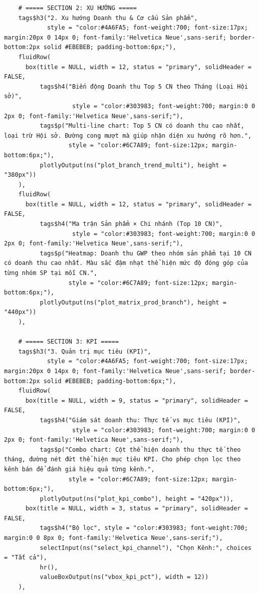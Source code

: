 \documentclass[12pt, a4paper]{article}
\begin{document}
\begin{lstlisting}
    # ===== SECTION 2: XU HƯỚNG =====
    tags$h3("2. Xu hướng Doanh thu & Cơ cấu Sản phẩm",
            style = "color:#4A6FA5; font-weight:700; font-size:17px; margin:20px 0 14px 0; font-family:'Helvetica Neue',sans-serif; border-bottom:2px solid #EBEBEB; padding-bottom:6px;"),
    fluidRow(
      box(title = NULL, width = 12, status = "primary", solidHeader = FALSE,
          tags$h4("Biến động Doanh thu Top 5 CN theo Tháng (Loại Hội sở)",
                   style = "color:#303983; font-weight:700; margin:0 0 2px 0; font-family:'Helvetica Neue',sans-serif;"),
          tags$p("Multi-line chart: Top 5 CN có doanh thu cao nhất, loại trừ Hội sở. Đường cong mượt mà giúp nhận diện xu hướng rõ hơn.",
                  style = "color:#6C7A89; font-size:12px; margin-bottom:6px;"),
          plotlyOutput(ns("plot_branch_trend_multi"), height = "380px"))
    ),
    fluidRow(
      box(title = NULL, width = 12, status = "primary", solidHeader = FALSE,
          tags$h4("Ma trận Sản phẩm × Chi nhánh (Top 10 CN)",
                   style = "color:#303983; font-weight:700; margin:0 0 2px 0; font-family:'Helvetica Neue',sans-serif;"),
          tags$p("Heatmap: Doanh thu GWP theo nhóm sản phẩm tại 10 CN có doanh thu cao nhất. Màu sắc đậm nhạt thể hiện mức độ đóng góp của từng nhóm SP tại mỗi CN.",
                  style = "color:#6C7A89; font-size:12px; margin-bottom:6px;"),
          plotlyOutput(ns("plot_matrix_prod_branch"), height = "440px"))
    ),

    # ===== SECTION 3: KPI =====
    tags$h3("3. Quản trị mục tiêu (KPI)",
            style = "color:#4A6FA5; font-weight:700; font-size:17px; margin:20px 0 14px 0; font-family:'Helvetica Neue',sans-serif; border-bottom:2px solid #EBEBEB; padding-bottom:6px;"),
    fluidRow(
      box(title = NULL, width = 9, status = "primary", solidHeader = FALSE,
          tags$h4("Giám sát doanh thu: Thực tế vs mục tiêu (KPI)",
                   style = "color:#303983; font-weight:700; margin:0 0 2px 0; font-family:'Helvetica Neue',sans-serif;"),
          tags$p("Combo chart: Cột thể hiện doanh thu thực tế theo tháng, đường nét đứt thể hiện mục tiêu KPI. Cho phép chọn lọc theo kênh bán để đánh giá hiệu quả từng kênh.",
                  style = "color:#6C7A89; font-size:12px; margin-bottom:6px;"),
          plotlyOutput(ns("plot_kpi_combo"), height = "420px")),
      box(title = NULL, width = 3, status = "primary", solidHeader = FALSE,
          tags$h4("Bộ lọc", style = "color:#303983; font-weight:700; margin:0 0 8px 0; font-family:'Helvetica Neue',sans-serif;"),
          selectInput(ns("select_kpi_channel"), "Chọn Kênh:", choices = "Tất cả"),
          hr(),
          valueBoxOutput(ns("vbox_kpi_pct"), width = 12))
    ),


\end{lstlisting}
\end{document}
